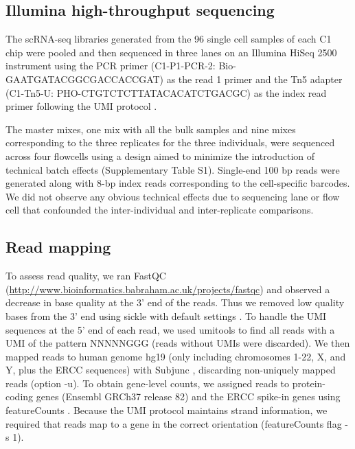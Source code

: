 \subsection{Illumina high-throughput
sequencing}\label{illumina-high-throughput-sequencing}

The scRNA-seq libraries generated from the 96 single cell samples of
each C1 chip were pooled and then sequenced in three lanes on an
Illumina HiSeq 2500 instrument using the PCR primer (C1-P1-PCR-2:
Bio-GAATGATACGGCGACCACCGAT) as the read 1 primer and the Tn5 adapter
(C1-Tn5-U: PHO-CTGTCTCTTATACACATCTGACGC) as the index read primer
following the UMI protocol \citep{Islam2014}.

The master mixes, one mix with all the bulk samples and nine mixes
corresponding to the three replicates for the three individuals, were
sequenced across four flowcells using a design aimed to minimize the
introduction of technical batch effects (Supplementary Table S1).
Single-end 100 bp reads were generated along with 8-bp index reads
corresponding to the cell-specific barcodes. We did not observe any
obvious technical effects due to sequencing lane or flow cell that
confounded the inter-individual and inter-replicate comparisons.

\subsection{Read mapping}\label{read-mapping}

To assess read quality, we ran FastQC
(\url{http://www.bioinformatics.babraham.ac.uk/projects/fastqc}) and
observed a decrease in base quality at the 3' end of the reads. Thus we
removed low quality bases from the 3' end using sickle with default
settings \citep{Joshi2011}. To handle the UMI sequences at the 5' end of
each read, we used umitools \citep{umitools} to find all reads with a UMI
of the pattern NNNNNGGG (reads without UMIs were discarded). We then
mapped reads to human genome hg19 (only including chromosomes 1-22, X,
and Y, plus the ERCC sequences) with Subjunc \citep{Liao2013}, discarding
non-uniquely mapped reads (option -u). To obtain gene-level counts, we
assigned reads to protein-coding genes (Ensembl GRCh37 release 82) and
the ERCC spike-in genes using featureCounts \citep{Liao2014}. Because the
UMI protocol maintains strand information, we required that reads map to
a gene in the correct orientation (featureCounts flag -s 1).

